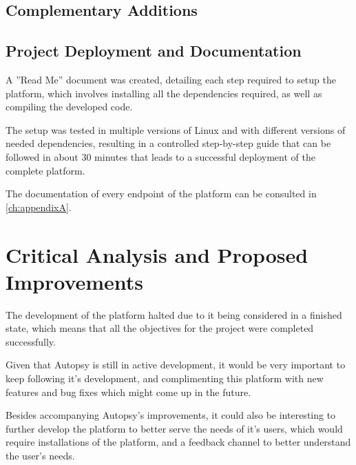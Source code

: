 \subsection{Complementary Additions}



\subsection{Project Deployment and Documentation}

A ''Read Me'' document was created, detailing each step required to setup the platform, which involves installing all the dependencies required, as well as compiling the developed code.

The setup was tested in multiple versions of Linux and with different versions of needed dependencies, resulting in a controlled step-by-step guide that can be followed in about 30 minutes that leads to a successful deployment of the complete platform.

The documentation of every endpoint of the platform can be consulted in \autoref{ch:appendixA}.

\section{Critical Analysis and Proposed Improvements}

The development of the platform halted due to it being considered in a finished state, which means that all the objectives for the project were completed successfully.

Given that Autopsy is still in active development, it would be very important to keep following it's development, and complimenting this platform with new features and bug fixes which might come up in the future.

Besides accompanying Autopsy's improvements, it could also be interesting to further develop the platform to better serve the needs of it's users, which would require installations of the platform, and a feedback channel to better understand the user's needs.
